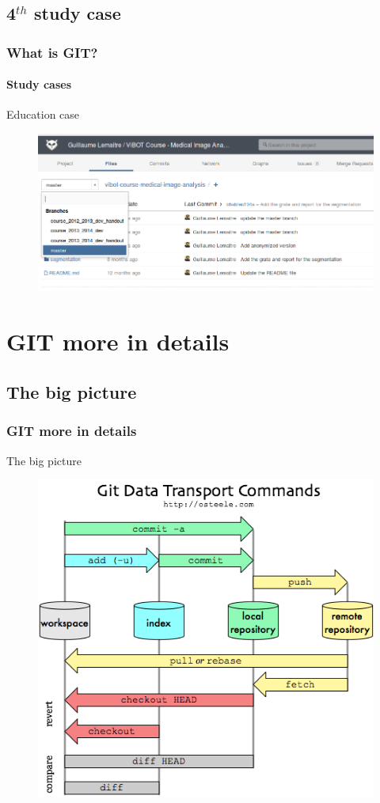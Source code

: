 \documentclass{beamer}
\begin{document}
\subsection{4$^{th}$ study case}

\begin{frame}
  \frametitle{What is GIT?}
  \framesubtitle{Study cases}
  \begin{block}{Education case}
    \begin{figure}
      \centering
      \includegraphics[width=.8\textwidth]{./images/vibot-course.png}
    \end{figure}
  \end{block}
\end{frame}

\section{GIT more in details}

\subsection{The big picture}

\begin{frame}
  \frametitle{GIT more in details}
  \begin{block}{The big picture}
    \begin{figure}
      \centering
      \includegraphics[width=.6\textwidth]{./images/git-transport.png}
    \end{figure}
  \end{block}
\end{frame}
\end{document}
